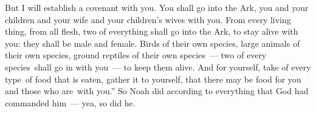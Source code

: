 \begin{inparaenum}
   But I will establish a covenant with you. You shall go into the Ark, you and your children and your wife and your children's wives with you.%
   From every living thing, from all flesh, two of everything shall go into the Ark, to stay alive with you: they shall be male and female.%
   Birds of their own species, large animals of their own species, ground reptiles of their own species~--- two of every species\understood{}\ shall go in with you~--- to keep them alive.%
   And for yourself, take of every type\understood{}\ of food that is eaten, gather it to yourself, that there may be food for you and those who are\understood{}\ with you.''%
   So Noah did according to everything that God had commanded him~--- yea, so did he.%
\end{inparaenum}
